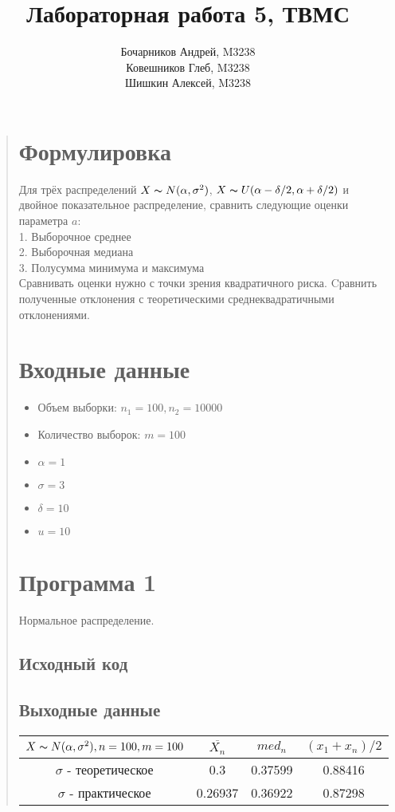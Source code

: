 \documentclass{article}
\begin{document}
\title{Лабораторная работа 5, ТВМС}
\author{
	Бочарников Андрей, M3238\\
	Ковешников Глеб, M3238\\
	Шишкин Алексей, M3238
}
\maketitle

\begin{quote}
\section{Формулировка}
	Для трёх распределений $X \thicksim N(\alpha, \sigma^2)$, $X \thicksim U(\alpha - \delta / 2, \alpha + \delta / 2)$ и двойное показательное распределение, сравнить следующие оценки параметра $a$:\\
	1. Выборочное среднее \\
	2. Выборочная медиана \\
	3. Полусумма минимума и максимума \\
	Сравнивать оценки нужно с точки зрения квадратичного риска. Cравнить полученные отклонения с теоретическими среднеквадратичными отклонениями.
\section{Входные данные}
        \begin{itemize}
            \item Объем выборки: $n_1 = 100, n_2 = 10000$
	    \item Количество выборок: $m = 100$
            \item $\alpha = 1$
	    \item $\sigma = 3$
	    \item $\delta = 10$
	    \item $u = 10$ 
        \end{itemize}
\section{Программа 1}	
        Нормальное распределение. \\
\subsection{Исходный код}
	
\subsection{Выходные данные}
\renewcommand{\arraystretch}{1.8}
\begin{tabular}{ | c | c | c | c | }
\hline
$X \thicksim N(\alpha, \sigma^2), n = 100, m = 100$ & $\overline{X_n}$ & $med_n$ & $(x_1 + x_n) / 2$ \\ \hline
$\sigma$ - теоретическое &  0.3 & 0.37599 & 0.88416 \\ \hline
$\sigma$ - практическое & 0.26937 & 0.36922 & 0.87298 \\
\hline
\end{tabular}


\end{quote}
\end{document}
